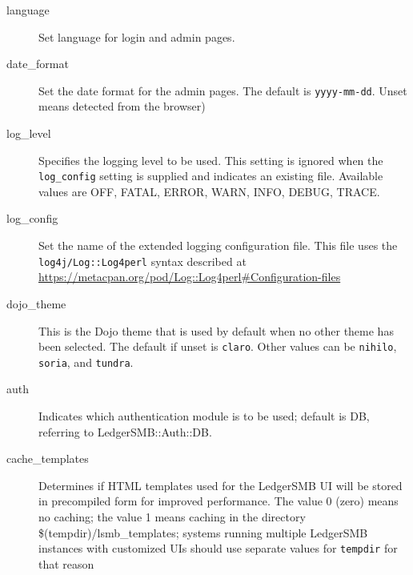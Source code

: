\begin{description}
        \item[language] Set language for login and admin pages. 
        \item[date\_format] Set the date format for the admin pages.  The default is \texttt{yyyy-mm-dd}. Unset means detected from the browser)
        \item[log\_level] Specifies the logging level to be used. This setting is ignored when the \texttt{log\_config} setting 
        is supplied and indicates an existing file. Available values are OFF, FATAL, ERROR, WARN, INFO, DEBUG, TRACE.
        \item [log\_config] Set the name of the extended logging configuration file. This file uses the \texttt{log4j/Log::Log4perl} syntax described at\\ \url{https://metacpan.org/pod/Log::Log4perl#Configuration-files}
        \item [dojo\_theme] This is the Dojo theme that is used by default when no other theme
        has been selected.  The default if unset is \texttt{claro}. Other values can be \texttt{nihilo}, \texttt{soria}, and \texttt{tundra}.
        \item[auth] Indicates which authentication module is to be used; default is DB, referring to LedgerSMB::Auth::DB.
        \item[cache\_templates] Determines if HTML templates used for the LedgerSMB UI will be stored
        in precompiled form for improved performance. The value 0 (zero) means no caching; the value
        1 means caching in the directory \$(tempdir)/lsmb\_templates; systems running multiple
        LedgerSMB instances with customized UIs should use separate values for {\tt tempdir} for that
        reason

        
\end{description}


